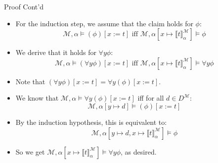 \documentclass[../slides.tex]{subfiles}
\begin{document}
\begin{frame}{Proof Cont'd}

  \begin{itemize}

  \item For the induction step, we assume that the claim holds for
    $\phi$:
    \[\mathcal{M},\alpha\vDash (\phi)[x:=t]\text{ iff
              }\mathcal{M},\alpha[x\mapsto \llbracket
              t\rrbracket^\mathcal{M}_\alpha]\vDash \phi\]

   \item We derive that it holds for $\forall y\phi$:
            \[\mathcal{M},\alpha\vDash (\forall
              y\phi)[x:=t]\text{ iff }
              \mathcal{M},\alpha[x\mapsto \llbracket
              t\rrbracket^\mathcal{M}_\alpha]\vDash \forall
              y\phi\]

    \item Note that $(\forall y\phi)[x:=t]=\forall y(\phi)[x:=t]$.

    \item We know that $\mathcal{M},\alpha\vDash \forall
      y(\phi)[x:=t]$ iff for all $d\in
      D^\mathcal{M}$: \[\mathcal{M},\alpha[y\mapsto d]\vDash
        (\phi)[x:=t]\]

    \item By the induction hypothesis, this is equivalent to:
      \[\mathcal{M},\alpha[y\mapsto d, x\mapsto \llbracket
        t\rrbracket^\mathcal{M}_\alpha]\vDash \phi\]

      \item So we get $\mathcal{M},\alpha[x\mapsto \llbracket
              t\rrbracket^\mathcal{M}_\alpha]\vDash \forall
              y\phi$, as desired.
    
  \end{itemize}
  
\end{frame}
\end{document}
